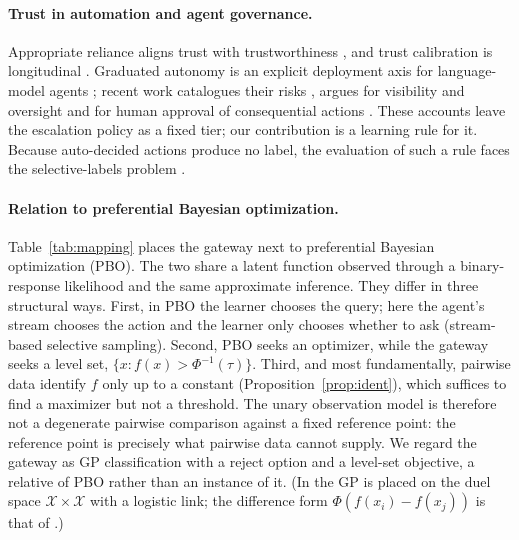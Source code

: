\documentclass[11pt]{article}
\begin{document}
\paragraph{Trust in automation and agent governance.} Appropriate reliance
aligns trust with trustworthiness \citep{lee2004trust}, and trust calibration
is longitudinal \citep{devisser2020longitudinal}. Graduated autonomy is an
explicit deployment axis for language-model agents \citep{morris2024levels};
recent work catalogues their risks \citep{chan2023harms}, argues for visibility
and oversight \citep{chan2024visibility} and for human approval of
consequential actions \citep{shavit2023practices}. These accounts leave the
escalation policy as a fixed tier; our contribution is a learning rule for it.
Because auto-decided actions produce no label, the evaluation of such a rule
faces the selective-labels problem \citep{lakkaraju2017selective}.

\paragraph{Relation to preferential Bayesian optimization.}\label{sec:pbo}
Table~\ref{tab:mapping} places the gateway next to preferential Bayesian
optimization (PBO). The two share a latent function observed through a
binary-response likelihood and the same approximate inference. They differ in
three structural ways. First, in PBO the learner chooses the query; here the
agent's stream chooses the action and the learner only chooses whether to ask
(stream-based selective sampling). Second, PBO seeks an optimizer, while the
gateway seeks a level set, $\{x : f(x) > \Phi^{-1}(\tau)\}$. Third, and most
fundamentally, pairwise data identify $f$ only up to a constant
(Proposition~\ref{prop:ident}), which suffices to find a maximizer but not a
threshold. The unary observation model is therefore not a degenerate pairwise
comparison against a fixed reference point: the reference point is precisely
what pairwise data cannot supply. We regard the gateway as GP classification
with a reject option and a level-set objective, a relative of PBO rather than
an instance of it. (In \citet{gonzalez2017preferential} the GP is placed on
the duel space $\mathcal X \times \mathcal X$ with a logistic link; the
difference form $\Phi(f(x_i) - f(x_j))$ is that of \citet{chu2005preference}.)
\end{document}
